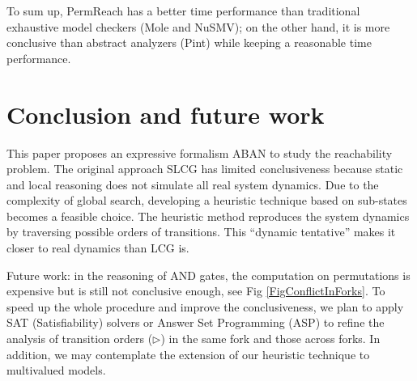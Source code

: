 \documentclass[runningheads]{llncs}
\begin{document}
To sum up, PermReach has a better time performance than traditional exhaustive model checkers (Mole and NuSMV); on the other hand, it is more conclusive than abstract analyzers (Pint) while keeping a reasonable time performance.

\section{Conclusion and future work}\label{sect:6}
This paper proposes an expressive formalism ABAN to study the reachability problem. 
The original approach SLCG has limited conclusiveness because static and local reasoning does not simulate all real system dynamics. 
Due to the complexity of global search, developing a heuristic technique based on sub-states becomes a feasible choice.
The heuristic method reproduces the system dynamics by traversing possible orders of transitions. 
This ``dynamic tentative'' makes it closer to real dynamics than LCG is.

Future work: in the reasoning of AND gates, the computation on permutations is expensive but is still not conclusive enough, see Fig \ref{FigConflictInForks}. 
To speed up the whole procedure and improve the conclusiveness, we plan to apply SAT (Satisfiability) solvers or Answer Set Programming (ASP) to refine the analysis of transition orders ($\triangleright$) in the same fork and those across forks. 
In addition, we may contemplate the extension of our heuristic technique to multivalued models.
\appendix
\end{document}
